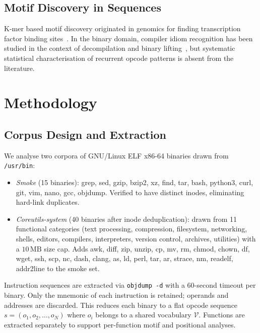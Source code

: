 \documentclass[10pt,twocolumn]{article}
\begin{document}
\subsection{Motif Discovery in Sequences}

K-mer based motif discovery originated in genomics for finding transcription
factor binding sites~\cite{das2007survey}.  In the binary domain, compiler
idiom recognition has been studied in the context of decompilation and binary
lifting~\cite{schulte2018evolving}, but systematic statistical characterisation
of recurrent opcode patterns is absent from the literature.

\section{Methodology}
\label{sec:methodology}

\subsection{Corpus Design and Extraction}

We analyse two corpora of GNU/Linux ELF x86-64 binaries drawn from
\texttt{/usr/bin}:
\begin{itemize}
  \item \emph{Smoke} (15 binaries): grep, sed, gzip, bzip2, xz, find, tar,
        bash, python3, curl, git, vim, nano, gcc, objdump.  Verified to have
        distinct inodes, eliminating hard-link duplicates.
  \item \emph{Coreutils-system} (40 binaries after inode deduplication):
        drawn from 11 functional categories (text processing, compression,
        filesystem, networking, shells, editors, compilers, interpreters,
        version control, archives, utilities) with a $10\,\text{MB}$ size cap.
        Adds awk, diff, zip, unzip, cp, mv, rm, chmod, chown, df, wget, ssh,
        scp, nc, dash, clang, as, ld, perl, tar, ar, strace, nm, readelf,
        addr2line to the smoke set.
\end{itemize}

Instruction sequences are extracted via \texttt{objdump -d} with a 60-second
timeout per binary.  Only the mnemonic of each instruction is retained; operands
and addresses are discarded.  This reduces each binary to a flat opcode
sequence $s = (o_1, o_2, \ldots, o_N)$ where $o_i$ belongs to a shared
vocabulary $\mathcal{V}$.  Functions are extracted separately to support
per-function motif and positional analyses.
\end{document}
